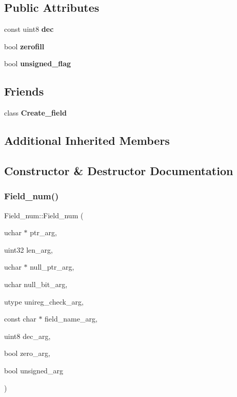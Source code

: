 \subsection*{Public Attributes}
\begin{DoxyCompactItemize}
\item 
\mbox{\label{classField__num_acb0a0804e5257ab805f8484d5a084f6f}} 
const uint8 {\bfseries dec}
\item 
\mbox{\label{classField__num_a1dfa80267397dc9ab100d57f82288ed3}} 
bool {\bfseries zerofill}
\item 
\mbox{\label{classField__num_af2642b6b58bb9398afaeabf6089344bd}} 
bool {\bfseries unsigned\+\_\+flag}
\end{DoxyCompactItemize}
\subsection*{Friends}
\begin{DoxyCompactItemize}
\item 
\mbox{\label{classField__num_a265d534d76a1476aa7d523bce5d390dc}} 
class {\bfseries Create\+\_\+field}
\end{DoxyCompactItemize}
\subsection*{Additional Inherited Members}


\subsection{Constructor \& Destructor Documentation}
\mbox{\label{classField__num_a7f74cee006e7ebcde71d71105bd66ec8}} 
\subsubsection{\texorpdfstring{Field\+\_\+num()}{Field\_num()}}
{\footnotesize\ttfamily Field\+\_\+num\+::\+Field\+\_\+num (\begin{DoxyParamCaption}\item[{uchar $\ast$}]{ptr\+\_\+arg,  }\item[{uint32}]{len\+\_\+arg,  }\item[{uchar $\ast$}]{null\+\_\+ptr\+\_\+arg,  }\item[{uchar}]{null\+\_\+bit\+\_\+arg,  }\item[{utype}]{unireg\+\_\+check\+\_\+arg,  }\item[{const char $\ast$}]{field\+\_\+name\+\_\+arg,  }\item[{uint8}]{dec\+\_\+arg,  }\item[{bool}]{zero\+\_\+arg,  }\item[{bool}]{unsigned\+\_\+arg }\end{DoxyParamCaption})}

